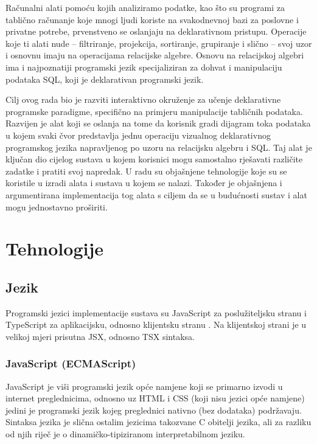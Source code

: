 \documentclass[times, utf8, diplomski, numeric]{fer}
\newcommand{\razmaks}{\vspace{10pt}}
\begin{document}
Računalni alati pomoću kojih analiziramo podatke, kao što su programi za tablično računanje koje mnogi ljudi koriste na svakodnevnoj bazi za poslovne i privatne potrebe, prvenstveno se oslanjaju na deklarativnom pristupu. 
Operacije koje ti alati nude -- filtriranje, projekcija, sortiranje, grupiranje i slično -- svoj uzor i osnovnu imaju na operacijama relacijske algebre.
Osnovu na relacijskoj algebri ima i najpoznatiji programski jezik specijaliziran za dohvat i manipulaciju podataka SQL, koji je deklarativan programski jezik.

\newpage

Cilj ovog rada bio je razviti interaktivno okruženje za učenje deklarativne programske paradigme, specifično na primjeru manipulacije tabličnih podataka.
Razvijen je alat koji se oslanja na tome da korisnik gradi dijagram toka podataka u kojem svaki čvor predstavlja jednu operaciju vizualnog deklarativnog programskog jezika napravljenog po uzoru na relacijsku algebru i SQL.
Taj alat je ključan dio cijelog sustava u kojem korisnici mogu samostalno rješavati različite zadatke i pratiti svoj napredak.
U radu su objašnjene tehnologije koje su se koristile u izradi alata i sustava u kojem se nalazi.
Također je objašnjena i argumentirana implementacija tog alata s ciljem da se u budućnosti sustav i alat mogu jednostavno proširiti.



\chapter{Tehnologije}


\section{Jezik}

Programski jezici implementacije sustava su JavaScript za poslužiteljsku stranu  i TypeScript za aplikacijsku, odnosno klijentsku stranu .
Na klijentskoj strani je u velikoj mjeri prisutna JSX, odnosno TSX sintaksa.


\razmaks
\subsection{JavaScript (ECMAScript)}

JavaScript je viši programski jezik opće namjene koji se primarno izvodi u internet preglednicima, odnosno uz HTML i CSS (koji nisu jezici opće namjene) jedini je programski jezik kojeg preglednici nativno (bez dodataka) podržavaju.
Sintaksa jezika je slična ostalim jezicima takozvane C obitelji jezika, ali za razliku od njih riječ je o dinamičko-tipiziranom  interpretabilnom jeziku.\citep{mdn_js}
\end{document}
